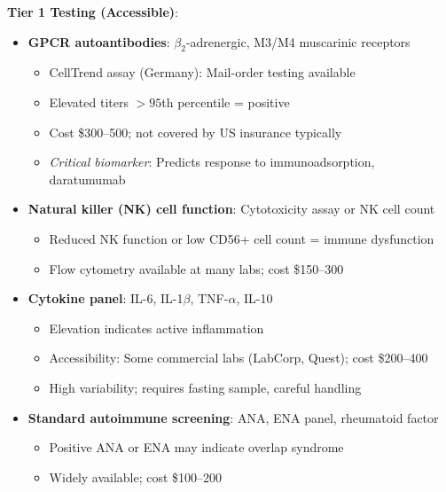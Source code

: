 \textbf{Tier 1 Testing (Accessible)}:
\begin{itemize}
    \item \textbf{GPCR autoantibodies}: $\beta_2$-adrenergic, M3/M4 muscarinic receptors
    \begin{itemize}
        \item CellTrend assay (Germany): Mail-order testing available
        \item Elevated titers $>95$th percentile = positive
        \item Cost \$300--500; not covered by US insurance typically
        \item \textit{Critical biomarker}: Predicts response to immunoadsorption, daratumumab~\cite{Scheibenbogen2018immunoadsorption,Fluge2025daratumumab}
    \end{itemize}

    \item \textbf{Natural killer (NK) cell function}: Cytotoxicity assay or NK cell count
    \begin{itemize}
        \item Reduced NK function or low CD56+ cell count = immune dysfunction
        \item Flow cytometry available at many labs; cost \$150--300
    \end{itemize}

    \item \textbf{Cytokine panel}: IL-6, IL-1$\beta$, TNF-$\alpha$, IL-10
    \begin{itemize}
        \item Elevation indicates active inflammation
        \item Accessibility: Some commercial labs (LabCorp, Quest); cost \$200--400
        \item High variability; requires fasting sample, careful handling
    \end{itemize}

    \item \textbf{Standard autoimmune screening}: ANA, ENA panel, rheumatoid factor
    \begin{itemize}
        \item Positive ANA or ENA may indicate overlap syndrome
        \item Widely available; cost \$100--200
    \end{itemize}
\end{itemize}

